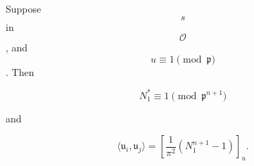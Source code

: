 Suppose $$s$$ in $$\mathcal{O}$$, and $$u \equiv 1 \pmod{\mathfrak{p}}$$. Then

$$N_1^* \equiv 1 \pmod{\mathfrak{p}^{n+1}}$$

and

$$\langle \mathfrak{u}_i, \mathfrak{u}_j \rangle = \left[ \frac{1}{\pi^2} \left(N_1^{n+1} - 1\right) \right]_u.$$
